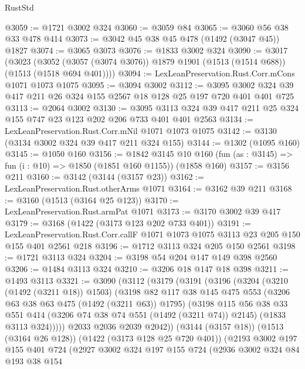 \begin{lexlean}{RustStd}
\begin{coremodule}
@3059 := @1721 @3002 @324
@3060 := @3059 @84
@3065 := @3060 @56 @38 @33 @478 @414
@3073 := @3042 @45 @38 @45 @478 (@1492 (@3047 @45)) @1827
@3074 := @3065 @3073
@3076 := @1833 @3002 @324
@3090 := @3017
    (@3023 (@3052 (@3057 (@3074 @3076)) @1879 @1901 (@1513 (@1514 @688)) (@1513 (@1518 @694 @401))))
@3094 := LexLeanPreservation.Rust.Corr.mCons @1071 @1073 @1075
@3095 := @3094 @3002
@3112 := @3095 @3002 @324 @39 @417 @211 @26 @324 @155 @2567 @18 @128 @25 @197 @720 @401 @401 @725
@3113 := @2064 @3002
@3130 := @3095 @3113 @324 @39 @417 @211 @25 @324 @155 @747 @23 @123 @202 @206 @733 @401 @401 @2563
@3134 := LexLeanPreservation.Rust.Corr.mNil @1071 @1073 @1075
@3142 := @3130 (@3134 @3002 @324 @39 @417 @211 @324 @155)
@3144 := @1302 (@1095 @160)
@3145 := @1050 @160
@3156 := @1842
    @3145
    @10
    @160
    (fun (as : @3145) => fun (i : @10) => @1850 (@1851 @160 @1155))
    (@1858 @160)
@3157 := @3156 @211
@3160 := @3142 (@3144 (@3157 @23))
@3162 := LexLeanPreservation.Rust.otherArms @1071
@3164 := @3162 @39 @211
@3168 := @3160 (@1513 (@3164 @25 @123))
@3170 := LexLeanPreservation.Rust.armPat @1071
@3173 := @3170 @3002 @39 @417
@3179 := @3168 (@1422 (@3173 @123 @202 @733 @401))
@3191 := LexLeanPreservation.Rust.Corr.callF
    @1071
    @1073
    @1075
    @3113
    @23
    @205
    @150
    @155
    @401
    @2561
    @218
@3196 := @1712 @3113 @324 @205 @150 @2561
@3198 := @1721 @3113 @324
@3204 := @3198 @54 @204 @147 @149 @398 @2560
@3206 := @1484 @3113 @324
@3210 := @3206 @18 @147 @18 @398
@3211 := @1493 @3113
@3321 := @3090
    (@3112
      (@3179
        (@3191
          (@3196
            (@3204
              (@3210 (@1492 (@3211 @18)) @1503)
              (@3198
                @82
                @117
                @38
                @145
                @475
                @553
                (@3206 @63 @38 @63 @475 (@1492 (@3211 @63)) @1795)
                (@3198
                  @115
                  @56
                  @38
                  @33
                  @551
                  @414
                  (@3206 @74 @38 @74 @551 (@1492 (@3211 @74)) @2145)
                  (@1833 @3113 @324)))))
          @2033
          @2036
          @2039
          @2042))
      (@3144 (@3157 @18))
      (@1513 (@3164 @26 @128))
      (@1422 (@3173 @128 @25 @720 @401))
      (@2193
        @3002
        @197
        @155
        @401
        @724
        (@2927
          @3002
          @324
          @197
          @155
          @724
          (@2936
            @3002
            @324
            @84
            @193
            @38
            @154

\end{coremodule}
\end{lexlean}
